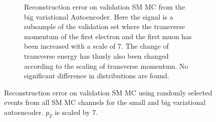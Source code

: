 \begin{figure}[h!]
\begin{subfigure}{.45\textwidth}
        \caption{Reconstruction error on validation SM MC from the big variational Autoencoder. Here the signal is a subsample of the validation 
        set where the transverse momentum of the first electron and the first muon has been increased with a scale of $7$. The change of transverse 
        energy has thusly also been changed according to the scaling of transverse momentum. No significant difference in distributions are found. }
        \label{fig:VAE_big_pt_7}
    \end{subfigure}
    \hfill 
    \caption[VAE | Reconstruction error $p_T$ altering of 7]{Reconstruction error on validation SM MC using randomly selected events from all SM 
    MC channels for the small and big variational autoencoder. $p_T$ is scaled by 7. }
    \label{fig:VAE_big_small_pt_7}
\end{figure}

